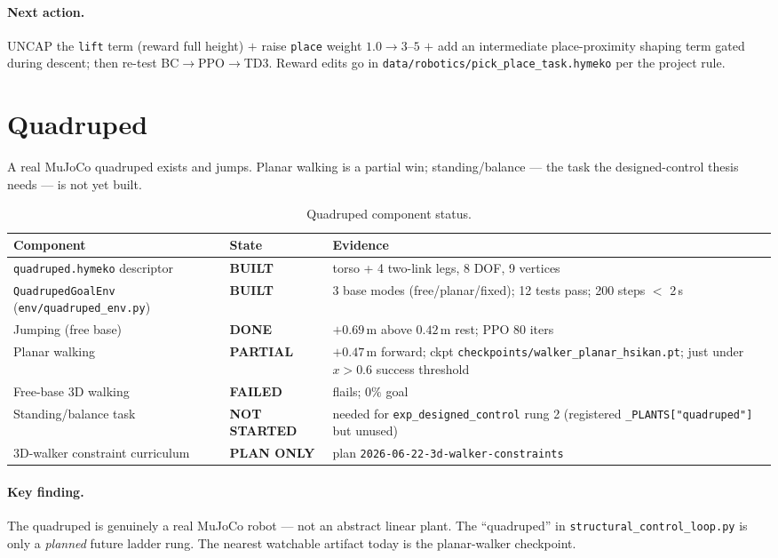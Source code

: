 \documentclass[11pt]{article}
\newcommand{\built}{\textcolor{green!55!black}{\textbf{BUILT}}}
\newcommand{\partialst}{\textcolor{orange!80!black}{\textbf{PARTIAL}}}
\newcommand{\done}{\textcolor{green!55!black}{\textbf{DONE}}}
\newcommand{\planonly}{\textcolor{orange!80!black}{\textbf{PLAN ONLY}}}
\newcommand{\notstarted}{\textcolor{red!75!black}{\textbf{NOT STARTED}}}
\newcommand{\failed}{\textcolor{red!75!black}{\textbf{FAILED}}}
\begin{document}
\paragraph{Next action.} UNCAP the \texttt{lift} term (reward full height) $+$
raise \texttt{place} weight $1.0 \rightarrow 3$--$5$ $+$ add an intermediate
place-proximity shaping term gated during descent; then re-test
BC$\rightarrow$PPO$\rightarrow$TD3. Reward edits go in
\texttt{data/robotics/pick\_place\_task.hymeko} per the project rule.

\section{Quadruped}

A real MuJoCo quadruped exists and jumps. Planar walking is a partial win;
standing/balance --- the task the designed-control thesis needs --- is not yet
built.

\begin{table}[h]
\centering
\begin{tabular}{@{}llp{6.0cm}@{}}
\toprule
\textbf{Component} & \textbf{State} & \textbf{Evidence} \\
\midrule
\texttt{quadruped.hymeko} descriptor & \built & torso + 4 two-link legs, 8 DOF, 9 vertices \\
\texttt{QuadrupedGoalEnv} (\texttt{env/quadruped\_env.py}) & \built & 3 base modes (free/planar/fixed); 12 tests pass; 200 steps $<$ 2\,s \\
Jumping (free base) & \done & $+0.69$\,m above $0.42$\,m rest; PPO 80 iters \\
Planar walking & \partialst & $+0.47$\,m forward; ckpt \texttt{checkpoints/walker\_planar\_hsikan.pt}; just under $x>0.6$ success threshold \\
Free-base 3D walking & \failed & flails; $0\%$ goal \\
Standing/balance task & \notstarted & needed for \texttt{exp\_designed\_control} rung 2 (registered \texttt{\_PLANTS["quadruped"]} but unused) \\
3D-walker constraint curriculum & \planonly & plan \texttt{2026-06-22-3d-walker-constraints} \\
\bottomrule
\end{tabular}
\caption{Quadruped component status.}
\end{table}

\paragraph{Key finding.} The quadruped is genuinely a real MuJoCo robot --- not an
abstract linear plant. The ``quadruped'' in \texttt{structural\_control\_loop.py}
is only a \emph{planned} future ladder rung. The nearest watchable artifact today
is the planar-walker checkpoint.
\end{document}
